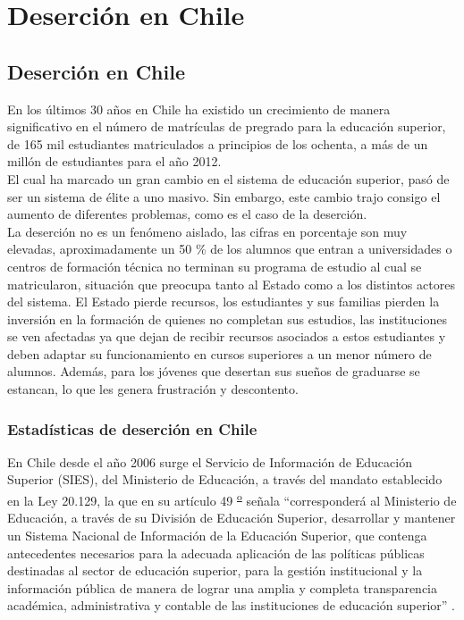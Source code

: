 \chapter[Deserción en Chile]{Deserción en Chile}
\label{ch:tema}


\section{Deserción en Chile}
\label{sec:deserción}

En los últimos 30 años en Chile ha existido un crecimiento de manera significativo en el número de matrículas de pregrado para la educación superior, de 165 mil estudiantes matriculados a principios de los ochenta, a más de un millón de estudiantes para el año 2012.\\

El cual ha marcado un gran cambio en el sistema de educación superior, pasó de ser un sistema de élite a uno masivo. Sin embargo, este cambio trajo consigo el aumento de diferentes problemas, como es el caso de la deserción.\\

La deserción no es un fenómeno aislado, las cifras en porcentaje son muy elevadas, aproximadamente un 50 \% de los alumnos que entran a universidades o centros de formación técnica no terminan su programa de estudio al cual se matricularon, situación que preocupa tanto al Estado como a los distintos actores del sistema. El Estado pierde recursos, los estudiantes y sus familias pierden la inversión en la formación de quienes no completan sus estudios, las instituciones se ven afectadas ya que dejan de recibir recursos asociados a estos estudiantes y deben adaptar su funcionamiento en cursos superiores a un menor número de alumnos. Además, para los jóvenes que desertan sus sueños de graduarse se estancan, lo que les genera frustración y descontento.\\


\subsection{Estadísticas de deserción en Chile}

En Chile desde el año 2006 surge el Servicio de Información de Educación Superior (SIES), del Ministerio de Educación, a través del mandato establecido en la Ley 20.129, la que en su artículo 49 \textsuperscript{\underline{o}} señala ``corresponderá al Ministerio de Educación, a través de su División de Educación Superior, desarrollar y mantener un Sistema Nacional de Información de la Educación Superior, que contenga antecedentes necesarios para la adecuada aplicación de las políticas públicas destinadas al sector de educación superior, para la gestión institucional y la información pública de manera de lograr una amplia y completa transparencia académica, administrativa y contable de las instituciones de educación superior'' \cite{sies}. \\

